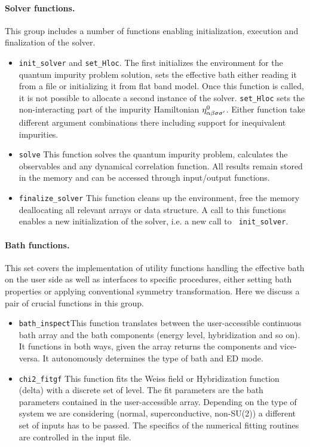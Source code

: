 \documentclass[edipack_sp.tex]{subfiles}
\begin{document}
\paragraph{{\bf Solver functions}.}
This group includes a number of functions enabling initialization,
execution and finalization  of the \NAME solver.
\begin{itemize}
  \item {\tt init\_solver} and {\tt set\_Hloc}. The first 
    initializes the \NAME environment for the quantum impurity problem
    solution, sets the effective bath either reading it from a file or
    initializing it from flat band model. Once this function is
    called, it is not possible to allocate a second instance of the solver.
    {\tt set\_Hloc} sets the
    non-interacting part of the impurity Hamiltonian $\eta^0_{\alpha\beta\sigma\sigma'}$. 
    Either function take different argument combinations there
    including support for inequivalent impurities.

  \item {\tt solve} This function solves the quantum impurity problem,
    calculates the observables and any dynamical correlation
    function. All results remain stored in the memory and can be accessed
    through input/output functions.

  \item {\tt finalize\_solver} This function cleans up the \NAME
    environment, free the memory deallocating all relevant arrays or
    data structure. A call to this functions enables a new
    initialization of the solver, i.e. a new call to {\tt
      init\_solver}.  
  \end{itemize}


\paragraph{{\bf Bath functions}.}
This set covers the implementation of utility functions handling the
effective bath on the user side as well as interfaces to specific
\NAME procedures, either setting bath properties or applying
conventional symmetry transformation. Here we discuss 
a pair of crucial functions in this group.
\begin{itemize}
\item {\tt bath\_inspect}This function translates between the
  user-accessible continuous bath array and the bath components
  (energy level, hybridization and so on). It functions in both ways,
  given the array returns the components and vice-versa. It
  autonomously determines the type of bath and ED mode.

\item {\tt chi2\_fitgf}
  This function fits the Weiss field or Hybridization function (delta)
  with a discrete set of level. The fit parameters are the bath
  parameters contained in the user-accessible array. Depending on the
  type of system we are considering (normal, superconductive,
  non-SU(2)) a different set of inputs has to be passed. The specifics
  of the numerical fitting routines are controlled in the input file.
  \end{itemize}
\end{document}
